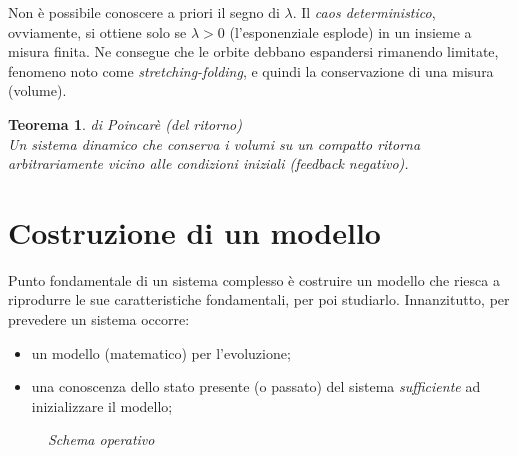 \documentclass[12pt, a4paper]{book}
\theoremstyle{theorem}
\newtheorem{theorem}{Teorema}[section]
\begin{document}
			Non è possibile conoscere a priori il segno di $\lambda$.
			Il \emph{caos deterministico}, ovviamente, si ottiene solo se $\lambda>0$ (l'esponenziale esplode) in un insieme a misura finita.
			Ne consegue che le orbite debbano espandersi rimanendo limitate, fenomeno noto come \emph{stretching-folding}, e quindi la conservazione di una misura (volume).
			\begin{theorem}
				di Poincarè (del ritorno)
				\\Un sistema dinamico che conserva i volumi su un compatto ritorna arbitrariamente vicino alle condizioni iniziali (feedback negativo).
				\label{theorem:poincare}
			\end{theorem}
		
		\section{Costruzione di un modello}
			Punto fondamentale di un sistema complesso è costruire un modello che riesca a riprodurre le sue caratteristiche fondamentali, per poi studiarlo.
			Innanzitutto, per prevedere un sistema occorre:
			\begin{itemize}
				\item un modello (matematico) per l'evoluzione;
				\item una conoscenza dello stato presente (o passato) del sistema \emph{sufficiente} ad inizializzare il modello;
			\end{itemize}
			\begin{figure}[H]
				\centering
				\caption{\emph{Schema operativo}}
				\label{figure:schema_operativo}
			\end{figure}
\end{document}
